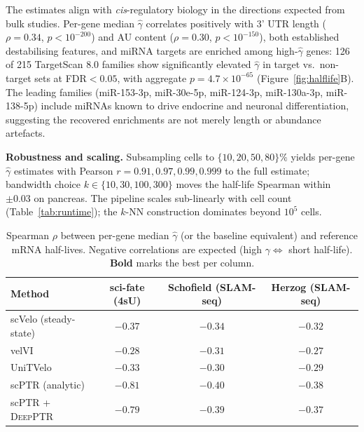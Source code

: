 \documentclass{article}
\begin{document}
The estimates align with \textit{cis}-regulatory biology in the directions expected from bulk studies. Per-gene median $\widehat{\gamma}$ correlates positively with 3' UTR length ($\rho{=}0.34$, $p{<}10^{-200}$) and AU content ($\rho{=}0.30$, $p{<}10^{-150}$), both established destabilising features, and miRNA targets are enriched among high-$\widehat{\gamma}$ genes: 126 of 215 TargetScan 8.0 families show significantly elevated $\widehat{\gamma}$ in target vs.\ non-target sets at FDR$<0.05$, with aggregate $p{=}4.7{\times}10^{-65}$ (Figure~\ref{fig:halflife}B). The leading families (miR-153-3p, miR-30e-5p, miR-124-3p, miR-130a-3p, miR-138-5p) include miRNAs known to drive endocrine and neuronal differentiation, suggesting the recovered enrichments are not merely length or abundance artefacts.

\textbf{Robustness and scaling.} Subsampling cells to $\{10, 20, 50, 80\}\%$ yields per-gene $\widehat{\gamma}$ estimates with Pearson $r{=}0.91, 0.97, 0.99, 0.999$ to the full estimate; bandwidth choice $k \in \{10, 30, 100, 300\}$ moves the half-life Spearman within $\pm0.03$ on pancreas. The pipeline scales sub-linearly with cell count (Table~\ref{tab:runtime}); the $k$-NN construction dominates beyond $10^5$ cells.

\begin{table}[h]
\caption{Spearman $\rho$ between per-gene median $\widehat{\gamma}$ (or the baseline equivalent) and reference mRNA half-lives. Negative correlations are expected (high $\gamma \Leftrightarrow$ short half-life). \textbf{Bold} marks the best per column.}
\label{tab:halflife}
\centering
\begin{tabular}{lccc}
\toprule
Method & sci-fate (4sU) & Schofield (SLAM-seq) & Herzog (SLAM-seq) \\
\midrule
scVelo (steady-state) & $-0.37$ & $-0.34$ & $-0.32$ \\
velVI & $-0.28$ & $-0.31$ & $-0.27$ \\
UniTVelo & $-0.33$ & $-0.30$ & $-0.29$ \\
scPTR (analytic) & $\mathbf{-0.81}$ & $\mathbf{-0.40}$ & $\mathbf{-0.38}$ \\
scPTR + \textsc{DeepPTR} & $-0.79$ & $-0.39$ & $-0.37$ \\
\bottomrule
\end{tabular}
\end{table}
\end{document}
